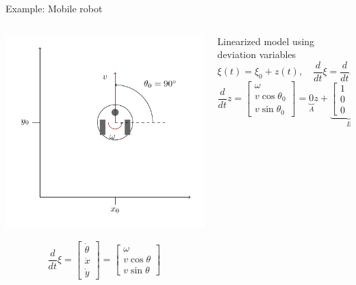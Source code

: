 \documentclass[presentation,aspectratio=169]{beamer}
\begin{document}
\begin{frame}[label={sec:org5256b71}]{Example: Mobile robot}
\small 
\begin{columns}
\begin{column}{0.4\columnwidth}
\begin{center}
 \includegraphics[width=1.0\linewidth]{../../figures/unicycle-model-op}
\end{center}

\[\frac{d}{dt} \xi = \begin{bmatrix} \dot{\theta}\\\dot{x}\\\dot{y} \end{bmatrix} = \begin{bmatrix} \omega\\ v\cos\theta\\v\sin\theta\end{bmatrix} \]
\end{column}
\begin{column}{0.6\columnwidth}
Linearized model using deviation variables
\[ \xi(t) = \xi_0 + z(t), \quad \frac{d}{dt} \xi = \frac{d}{dt} z,  \quad \theta_0=90^\circ, v_0 = 0\]
\[ \frac{d}{dt} z = \begin{bmatrix} \omega\\ v\cos\theta_0 \\ v\sin\theta_0 \end{bmatrix}
= \underbrace{0}_{A} z + \underbrace{\begin{bmatrix} 1 & 0 \\ 0 & 0\\ 0 & 1\end{bmatrix}}_{B} \begin{bmatrix}\omega\\v\end{bmatrix} \]


\end{column}
\end{columns}
\end{frame}
\end{document}
